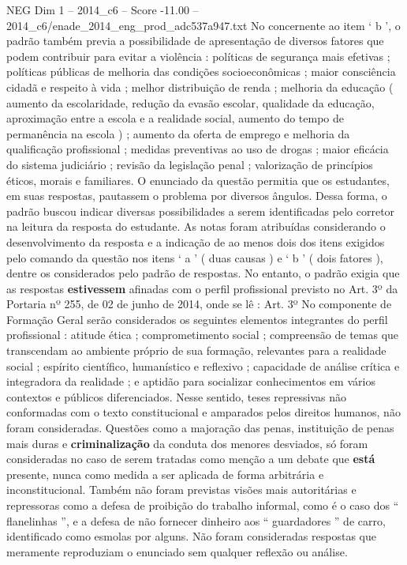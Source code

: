 \begin{textsample}{NEG Dim 1 – 2014\_c6 – Score -11.00 – 2014\_c6/enade\_2014\_eng\_prod\_adc537a947.txt}
No concernente ao item ‘ b ’, o padrão também previa a possibilidade de apresentação de diversos fatores que podem contribuir para evitar a violência : políticas de segurança mais efetivas ; políticas públicas de melhoria das condições socioeconômicas ; maior consciência cidadã e respeito à vida ; melhor distribuição de renda ; melhoria da educação ( aumento da escolaridade, redução da evasão escolar, qualidade da educação, aproximação entre a escola e a realidade social, aumento do tempo de permanência na escola ) ; aumento da oferta de emprego e melhoria da qualificação profissional ; medidas preventivas ao uso de drogas ; maior eficácia do sistema judiciário ; revisão da legislação penal ; valorização de princípios éticos, morais e familiares.
O enunciado da questão permitia que os estudantes, em suas respostas, pautassem o problema por diversos ângulos.
Dessa forma, o padrão buscou indicar diversas possibilidades a serem identificadas pelo corretor na leitura da resposta do estudante.
As notas foram atribuídas considerando o desenvolvimento da resposta e a indicação de ao menos dois dos itens exigidos pelo comando da questão nos itens ‘ a ’ ( duas causas ) e ‘ b ’ ( dois fatores ), dentre os considerados pelo padrão de respostas.
No entanto, o padrão exigia que as respostas \textbf{estivessem} afinadas com o perfil profissional previsto no Art. 3º da Portaria nº 255, de 02 de junho de 2014, onde se lê : Art. 3º No componente de Formação Geral serão considerados os seguintes elementos integrantes do perfil profissional : atitude ética ; comprometimento social ; compreensão de temas que transcendam ao ambiente próprio de sua formação, relevantes para a realidade social ; espírito científico, humanístico e reflexivo ; capacidade de análise crítica e integradora da realidade ; e aptidão para socializar conhecimentos em vários contextos e públicos diferenciados.
Nesse sentido, teses repressivas não conformadas com o texto constitucional e amparados pelos direitos humanos, não foram consideradas.
Questões como a majoração das penas, instituição de penas mais duras e \textbf{criminalização} da conduta dos menores desviados, só foram consideradas no caso de serem tratadas como menção a um debate que \textbf{está} presente, nunca como medida a ser aplicada de forma arbitrária e inconstitucional.
Também não foram previstas visões mais autoritárias e repressoras como a defesa de proibição do trabalho informal, como é o caso dos “ flanelinhas ”, e a defesa de não fornecer dinheiro aos “ guardadores ” de carro, identificado como esmolas por alguns.
Não foram consideradas respostas que meramente reproduziam o enunciado sem qualquer reflexão ou análise.

\end{textsample}
